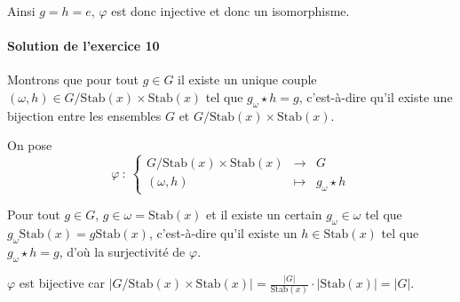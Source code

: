 \documentclass[]{article}
\theoremstyle{remark}
\theoremstyle{definition}
\newcommand{\func}[5]{
#1 ~ : ~ \left\{ \begin{array}{lcl}
	#2 & \longrightarrow & #3 \\
	#4 & \longmapsto & #5
\end{array}
\right.
}
\begin{document}
Ainsi $g = h = e$, $\varphi$ est donc injective et donc un isomorphisme.

\paragraph{Solution de l'exercice 10}

Montrons que pour tout $g \in G$ il existe un unique couple $(\omega, h) \in G / \text{Stab}(x) \times \text{Stab}(x)$ tel que $g_\omega \star h = g$, c'est-à-dire qu'il existe une bijection entre les ensembles $G$ et $G/\text{Stab}(x) \times \text{Stab}(x)$.

On pose $$\func{\varphi}{G/\text{Stab}(x) \times \text{Stab}(x)}{G}{(\omega, h)}{g_\omega \star h}$$

Pour tout $g \in G$, $g \in \omega = \text{Stab}(x)$ et il existe un certain $g_\omega \in \omega$ tel que $g_\omega \text{Stab}(x) = g \text{Stab}(x)$, c'est-à-dire qu'il existe un $h \in \text{Stab}(x)$ tel que $g_\omega \star h = g$, d'où la surjectivité de $\varphi$.

$\varphi$ est bijective car $\left|G / \text{Stab}(x) \times \text{Stab}(x)\right| = \frac{|G|}{\text{Stab}(x)} \cdot |\text{Stab}(x)| = |G|$.
\end{document}
